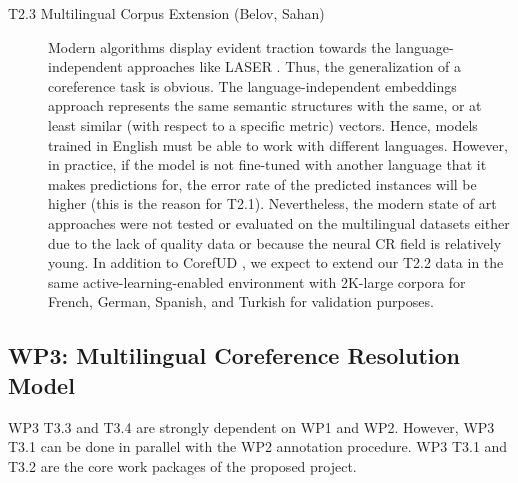 \begin{description}
	\item [T2.3 Multilingual Corpus Extension (Belov, Sahan)] Modern algorithms display evident traction towards the language-independent approaches like LASER \cite{artetxe2019massively}. 
	Thus, the generalization of a coreference task is obvious. The language-independent embeddings approach represents the same semantic structures with the same, or at least similar (with respect to a specific metric) vectors. 
	Hence, models trained in English must be able to work with different languages. 
	However, in practice, if the model is not fine-tuned with another language that it makes predictions for, the error rate of the predicted instances will be higher (this is the reason for T2.1). 
	Nevertheless, the modern state of art approaches were not tested or evaluated on the multilingual datasets either due to the lack of quality data or because the neural CR field is relatively young. 
	In addition to CorefUD \cite{cr-mult-Nedoluzhko2021}, we expect to extend our T2.2 data in the same active-learning-enabled environment with 2K-large corpora for French, German, Spanish, and Turkish for validation purposes.

\end{description}


\subsection*{WP3: Multilingual Coreference Resolution Model}

WP3 T3.3 and T3.4  are strongly dependent on WP1 and WP2. However, WP3 T3.1 can be done in parallel with the WP2 annotation procedure. WP3 T3.1 and T3.2 are the core work packages of the proposed project.

